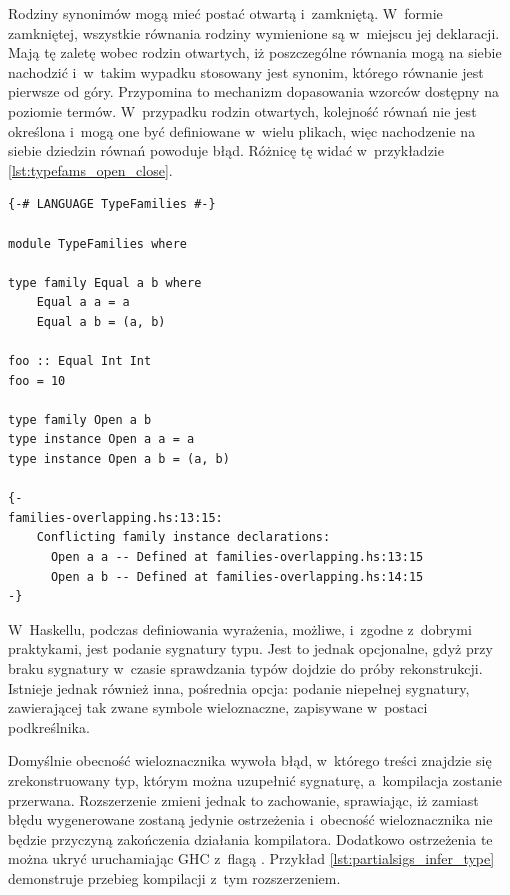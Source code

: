 Rodziny synonimów mogą mieć postać otwartą i~zamkniętą. W~formie
zamkniętej, wszystkie równania rodziny wymienione są w~miejscu jej
deklaracji. Mają tę zaletę wobec rodzin otwartych, iż poszczególne równania mogą na
siebie nachodzić i~w~takim wypadku stosowany jest synonim, którego równanie jest
pierwsze od góry. Przypomina to mechanizm dopasowania wzorców dostępny na poziomie
termów. W~przypadku rodzin otwartych, kolejność równań nie jest
określona i~mogą one być definiowane w~wielu plikach, więc nachodzenie na siebie
dziedzin równań powoduje błąd. Różnicę tę widać w~przykładzie
\ref{lst:typefams_open_close}\cite{GuideTypeFamilies}.

\begin{lstlisting}[float,label={lst:typefams_open_close},
                   caption={Przykład otwartej i zamkniętej funkcji na typach z nachodzącymi na siebie dziedzinami.}]
{-# LANGUAGE TypeFamilies #-}

module TypeFamilies where

type family Equal a b where
    Equal a a = a
    Equal a b = (a, b)

foo :: Equal Int Int
foo = 10

type family Open a b
type instance Open a a = a
type instance Open a b = (a, b)

{-
families-overlapping.hs:13:15:
    Conflicting family instance declarations:
      Open a a -- Defined at families-overlapping.hs:13:15
      Open a b -- Defined at families-overlapping.hs:14:15
-}
\end{lstlisting}

\label{sec:partial_sigs}

W~Haskellu, podczas definiowania wyrażenia, możliwe, i~zgodne z~dobrymi
praktykami, jest podanie sygnatury typu. Jest to jednak opcjonalne, gdyż przy
braku sygnatury w~czasie sprawdzania typów dojdzie do próby
rekonstrukcji. Istnieje jednak również inna, pośrednia opcja: podanie niepełnej
sygnatury, zawierającej tak zwane symbole wieloznaczne, zapisywane w~postaci
podkreślnika.

Domyślnie obecność wieloznacznika wywoła błąd, w~którego treści znajdzie się
zrekonstruowany typ, którym można uzupełnić sygnaturę, a~kompilacja zostanie
przerwana. Rozszerzenie  zmieni jednak to
zachowanie, sprawiając, iż zamiast błędu wygenerowane zostaną jedynie
ostrzeżenia i~obecność wieloznacznika nie będzie przyczyną zakończenia działania
kompilatora. Dodatkowo ostrzeżenia te można ukryć uruchamiając GHC z~flagą
. Przykład
\ref{lst:partialsigs_infer_type} demonstruje przebieg kompilacji z~tym
rozszerzeniem.

